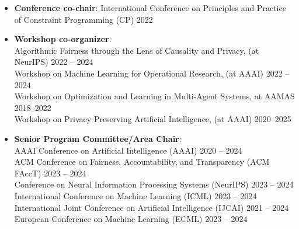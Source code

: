\documentclass[localFont,alternative]{metadataShortBio}
\begin{document}

  \begin{itemize}[leftmargin=0.4cm]
    \item {\bf Conference co-chair}:  
    {International Conference on Principles and Practice of Constraint Programming (CP)}  \hfill{2022}


    \item {\bf Workshop co-organizer}: \\
    {Algorithmic Fairness through the Lens of Causality and Privacy, (at NeurIPS)} \hfill{2022 -- 2024}\\
    {Workshop on Machine Learning for Operational Research, (at AAAI)}   \hfill{2022 -- 2024}\\
    {Workshop on Optimization and Learning in Multi-Agent Systems, at AAMAS} \hfill{2018--2022}\\
    {Workshop on Privacy Preserving Artificial Intelligence, (at AAAI)}   \hfill{2020--2025}
    
    \item {\bf Senior Program Committee/Area Chair}: \\
    AAAI Conference on Artificial Intelligence (AAAI) \hfill {2020 -- 2024}\\
		ACM Conference on Fairness, Accountability, and Transparency (ACM FAccT) \hfill {2023 -- 2024}\\
    Conference on Neural Information Processing Systems (NeurIPS) \hfill{2023 -- 2024}\\
    International Conference on Machine Learning (ICML) \hfill {2023 -- 2024}\\
    International Joint Conference on Artificial Intelligence (IJCAI) \hfill {2021 -- 2024}\\
    European Conference on Machine Learning (ECML) \hfill{2023 -- 2024}


 
  \end{itemize}
\end{document}
